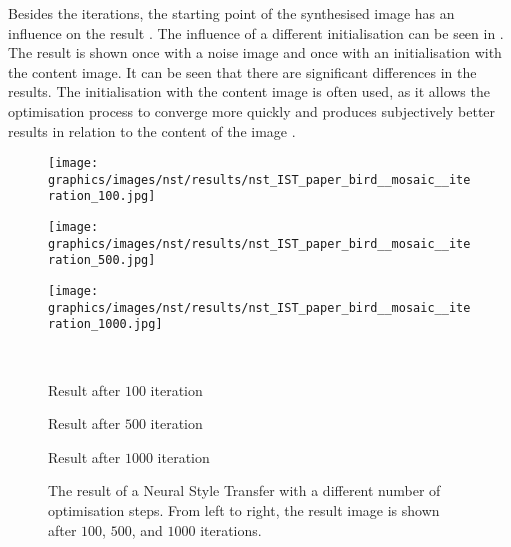 Besides the iterations, the starting point of the synthesised image \image{} has an influence on the result \cite{GEB2016}. The influence of a different initialisation can be seen in . The result is shown once with a noise image and once with an initialisation with the content image. It can be seen that there are significant differences in the results. The initialisation with the content image is often used, as it allows the optimisation process to converge more quickly and produces subjectively better results in relation to the content of the image \cite{GEB2016}.
\begin{figure}[h]
	\centering
	\begin{minipage}{.33\textwidth}
		\centering
		\texttt{[image: graphics/images/nst/results/nst\_IST\_paper\_bird\_\_mosaic\_\_iteration\_100.jpg]}
	\end{minipage}%
	\begin{minipage}{.33\textwidth}
		\centering
		\texttt{[image: graphics/images/nst/results/nst\_IST\_paper\_bird\_\_mosaic\_\_iteration\_500.jpg]}
	\end{minipage}%
	\begin{minipage}{.33\textwidth}
	\centering
	\texttt{[image: graphics/images/nst/results/nst\_IST\_paper\_bird\_\_mosaic\_\_iteration\_1000.jpg]}
	\end{minipage}\\ \vspace{0.15cm}
	\begin{minipage}{.33\textwidth}
		\centering
		Result after $100$ iteration
	\end{minipage}%
	\begin{minipage}{.33\textwidth}
		\centering
		Result after $500$ iteration
	\end{minipage}%
	\begin{minipage}{.33\textwidth}
		\centering
		Result after $1000$ iteration
	\end{minipage}
	\caption{The result of a Neural Style Transfer with a different number of optimisation steps. From left to right, the result image is shown after $100$, $500$, and $1000$ iterations.}
	\label{fig:iteration_nst}
\end{figure}


